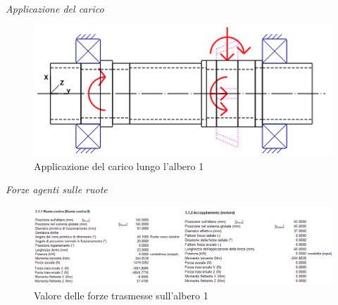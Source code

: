\emph{Applicazione del carico}
\begin{figure}[h]
    \centering
    \includegraphics[scale=0.5]{Immagini/CaricoAlbero1.png}
    \caption{Applicazione del carico lungo l'albero 1}
    \label{fig:CaricoAlbero1}
\end{figure}
\newpage
\emph{Forze agenti sulle ruote}
\begin{figure}[h]
    \centering
    \includegraphics[scale=0.7]{Immagini/ForzeRuoteAlbero1.png}
    \caption{Valore delle forze trasmesse sull'albero 1}
    \label{fig:ForzeRuoteAlbero1}
\end{figure}

